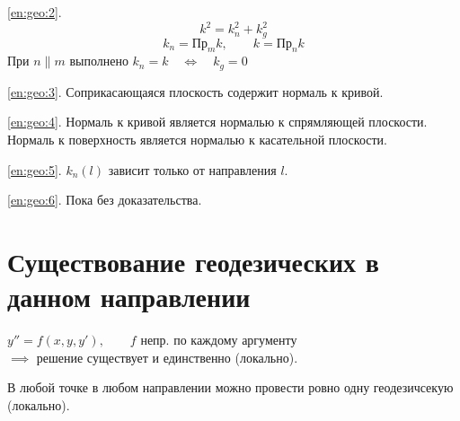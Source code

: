 \begin{eproof}
	\item[\ref{en:geo:2}.]
	$$ k^2 = k_n^2 + k_g^2 $$
	$$ k_n = \text{Пр}_m k, \qquad k = \text{Пр}_n k $$
	При $ n \parallel m $ выполнено $ k_n = k \quad \iff \quad k_g = 0 $

	\item[\ref{en:geo:3}.] Соприкасающаяся плоскость содержит нормаль к кривой.

	\item[\ref{en:geo:4}.] Нормаль к кривой является нормалью к спрямляющей плоскости. Нормаль к поверхность является нормалью к касательной плоскости.

	\item[\ref{en:geo:5}.] $ k_n(l) $ зависит только от направления $ l $.

	\item[\ref{en:geo:6}.] Пока без доказательства.
\end{eproof}

\section{Существование геодезических в данном направлении}

\begin{statement}[из дифуров]
	$ y'' = f(x, y, y'), \qquad f $ непр. по каждому аргументу \\
	$ \implies $ решение существует и единственно (локально).
\end{statement}

\begin{theorem}
	В любой точке в любом направлении можно провести ровно одну геодезичсекую (локально).
\end{theorem}

